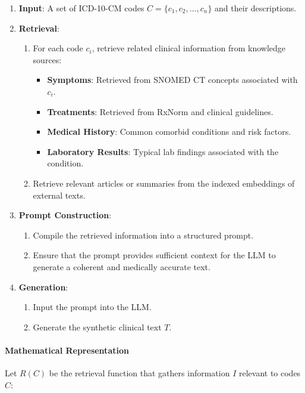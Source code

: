 \documentclass[12pt, a4paper]{article}
\begin{document}
\begin{enumerate}
    \item \textbf{Input}: A set of ICD-10-CM codes \( C = \{c_1, c_2, ..., c_n\} \) and their descriptions.
    \item \textbf{Retrieval}:
    \begin{enumerate}
        \item For each code \( c_i \), retrieve related clinical information from knowledge sources:
        \begin{itemize}
            \item \textbf{Symptoms}: Retrieved from SNOMED CT concepts associated with \( c_i \).
            \item \textbf{Treatments}: Retrieved from RxNorm and clinical guidelines.
            \item \textbf{Medical History}: Common comorbid conditions and risk factors.
            \item \textbf{Laboratory Results}: Typical lab findings associated with the condition.
        \end{itemize}
        \item Retrieve relevant articles or summaries from the indexed embeddings of external texts.
    \end{enumerate}
    \item \textbf{Prompt Construction}:
    \begin{enumerate}
        \item Compile the retrieved information into a structured prompt.
        \item Ensure that the prompt provides sufficient context for the LLM to generate a coherent and medically accurate text.
    \end{enumerate}
    \item \textbf{Generation}:
    \begin{enumerate}
        \item Input the prompt into the LLM.
        \item Generate the synthetic clinical text \( T \).
    \end{enumerate}
\end{enumerate}

\paragraph{Mathematical Representation}

Let \( R(C) \) be the retrieval function that gathers information \( I \) relevant to codes \( C \):
\end{document}
